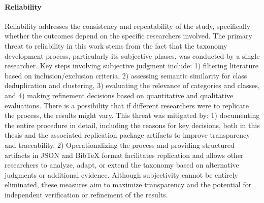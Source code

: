 \paragraph{Reliability}
Reliability addresses the consistency and repeatability of the study, specifically whether the outcomes depend on the specific researchers involved. The primary threat to reliability in this work stems from the fact that the taxonomy development process, particularly its subjective phases, was conducted by a single researcher. Key steps involving subjective judgment include: 1) filtering literature based on inclusion/exclusion criteria, 2) assessing semantic similarity for class deduplication and clustering, 3) evaluating the relevance of categories and classes, and 4) making refinement decisions based on quantitative and qualitative evaluations. There is a possibility that if different researchers were to replicate the process, the results might vary. This threat was mitigated by: 1) documenting the entire procedure in detail, including the reasons for key decisions, both in this thesis and the associated replication package artifacts to improve transparency and traceability. 2) Operationalizing the process and providing structured artifacts in JSON and BibTeX format facilitates replication and allows other researchers to analyze, adapt, or extend the taxonomy based on alternative judgments or additional evidence. Although subjectivity cannot be entirely eliminated, these measures aim to maximize transparency and the potential for independent verification or refinement of the results.